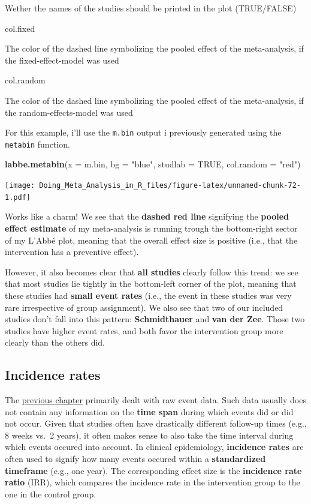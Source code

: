 \documentclass[]{book}
\newenvironment{Shaded}{\begin{snugshade}}{\end{snugshade}}
\newcommand{\DataTypeTok}[1]{\textcolor[rgb]{0.13,0.29,0.53}{#1}}
\newcommand{\KeywordTok}[1]{\textcolor[rgb]{0.13,0.29,0.53}{\textbf{#1}}}
\newcommand{\NormalTok}[1]{#1}
\newcommand{\OtherTok}[1]{\textcolor[rgb]{0.56,0.35,0.01}{#1}}
\newcommand{\StringTok}[1]{\textcolor[rgb]{0.31,0.60,0.02}{#1}}
\begin{document}
Wether the names of the studies should be printed in the plot (TRUE/FALSE)

col.fixed

The color of the dashed line symbolizing the pooled effect of the meta-analysis, if the fixed-effect-model was used

col.random

The color of the dashed line symbolizing the pooled effect of the meta-analysis, if the random-effects-model was used

For this example, i'll use the \texttt{m.bin} output i previously generated using the \texttt{metabin} function.

\begin{Shaded}
\begin{Highlighting}[]
\KeywordTok{labbe.metabin}\NormalTok{(}\DataTypeTok{x =}\NormalTok{ m.bin,}
              \DataTypeTok{bg =} \StringTok{"blue"}\NormalTok{,}
              \DataTypeTok{studlab =} \OtherTok{TRUE}\NormalTok{,}
              \DataTypeTok{col.random =} \StringTok{"red"}\NormalTok{)}
\end{Highlighting}
\end{Shaded}

\texttt{[image: Doing\_Meta\_Analysis\_in\_R\_files/figure-latex/unnamed-chunk-72-1.pdf]}

Works like a charm! We see that the \textbf{dashed red line} signifying the \textbf{pooled effect estimate} of my meta-analysis is running trough the bottom-right sector of my L'Abbé plot, meaning that the overall effect size is positive (i.e., that the intervention has a preventive effect).

However, it also becomes clear that \textbf{all studies} clearly follow this trend: we see that most studies lie tightly in the bottom-left corner of the plot, meaning that these studies had \textbf{small event rates} (i.e., the event in these studies was very rare irrespective of group assignment). We also see that two of our included studies don't fall into this pattern: \textbf{Schmidthauer} and \textbf{van der Zee}. Those two studies have higher event rates, and both favor the intervention group more clearly than the others did.

\hypertarget{incidence-rates}{%
\subsection{Incidence rates}\label{incidence-rates}}

The \protect\hyperlink{binary}{previous chapter} primarily dealt with raw event data. Such data usually does not contain any information on the \textbf{time span} during which events did or did not occur. Given that studies often have drastically different follow-up times (e.g., 8 weeks vs.~2 years), it often makes sense to also take the time interval during which events occured into account. In clinical epidemiology, \textbf{incidence rates} are often used to signify how many events occured within a \textbf{standardized timeframe} (e.g., one year). The corresponding effect size is the \textbf{incidence rate ratio} (IRR), which compares the incidence rate in the intervention group to the one in the control group.
\end{document}
